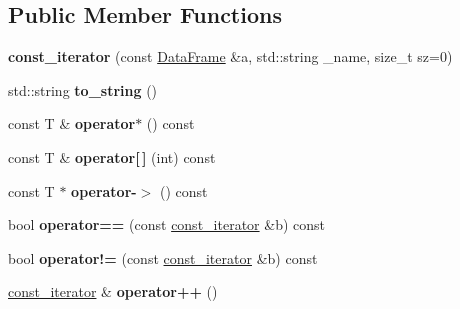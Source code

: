 \subsection*{Public Member Functions}
\begin{DoxyCompactItemize}
\item 
\mbox{\label{classDataFrame_1_1const__iterator_a03496624ea56e3355d637e8acf64a2e2}} 
{\bfseries const\+\_\+iterator} (const \hyperlink{classDataFrame}{Data\+Frame} \&a, std\+::string \+\_\+name, size\+\_\+t sz=0)
\item 
\mbox{\label{classDataFrame_1_1const__iterator_a74a8da991f8a22b048b9027cdf69e23e}} 
std\+::string {\bfseries to\+\_\+string} ()
\item 
\mbox{\label{classDataFrame_1_1const__iterator_a23515991e2f4ec34e3655c69e51f2ddb}} 
const T \& {\bfseries operator$\ast$} () const
\item 
\mbox{\label{classDataFrame_1_1const__iterator_af281aa96da77ecd1b83a56e515fba1b3}} 
const T \& {\bfseries operator\mbox{[}$\,$\mbox{]}} (int) const
\item 
\mbox{\label{classDataFrame_1_1const__iterator_abb84bca0ec3901751c11098fd87ccc27}} 
const T $\ast$ {\bfseries operator-\/$>$} () const
\item 
\mbox{\label{classDataFrame_1_1const__iterator_abcf482aea9fb3317ea4342f829db3ab5}} 
bool {\bfseries operator==} (const \hyperlink{classDataFrame_1_1const__iterator}{const\+\_\+iterator} \&b) const
\item 
\mbox{\label{classDataFrame_1_1const__iterator_aa42d287cf4e3d4244e6714abd7e53e94}} 
bool {\bfseries operator!=} (const \hyperlink{classDataFrame_1_1const__iterator}{const\+\_\+iterator} \&b) const
\item 
\mbox{\label{classDataFrame_1_1const__iterator_aeb457c49154bd271fcc369b9d7288eaa}} 
\hyperlink{classDataFrame_1_1const__iterator}{const\+\_\+iterator} \& {\bfseries operator++} ()

\end{DoxyCompactItemize}
